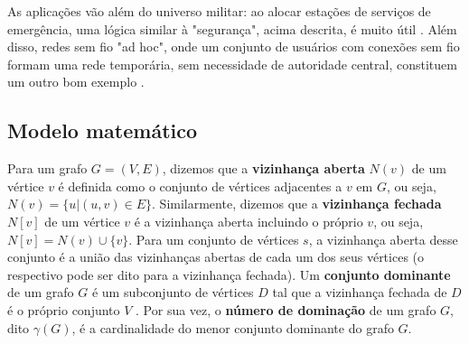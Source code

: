 \documentclass[11pt]{article}
\begin{document}
As aplicações vão além do universo militar: ao alocar estações de serviços de emergência, uma lógica similar à "segurança", acima descrita, é muito útil \autocite{GhaffariHadigheh2019Romandominationproblem}. Além disso, redes sem fio "ad hoc", onde um conjunto de usuários com conexões sem fio formam uma rede temporária, sem necessidade de autoridade central, constituem um outro bom exemplo \autocite{Wu2000Dominationitsapplications} .


\subsection{Modelo matemático}
\label{sec:org39568a7}
Para um grafo \(G = (V, E)\), dizemos que a \textbf{vizinhança aberta} \(N(v)\) de um vértice \(v\) é definida como o conjunto de vértices adjacentes a \(v\) em \(G\), ou seja, \(N(v) = \{u|(u, v) \in E\}\).
Similarmente, dizemos que a \textbf{vizinhança fechada} \(N[v]\) de um vértice \(v\) é a vizinhança aberta incluindo o próprio \(v\), ou seja, \(N[v] = N(v) \cup \{v\}\).
Para um conjunto de vértices \(s\), a vizinhança aberta desse conjunto é a união das vizinhanças abertas de cada um dos seus vértices (o respectivo pode ser dito para a vizinhança fechada).
Um \textbf{conjunto dominante} de um grafo \(G\) é um subconjunto de vértices \(D\) tal que a vizinhança fechada de \(D\) é o próprio conjunto \(V\) .
Por sua vez, o \textbf{número de dominação} de um grafo \(G\), dito \(\gamma(G)\), é a cardinalidade do menor conjunto dominante do grafo \(G\).
\end{document}
